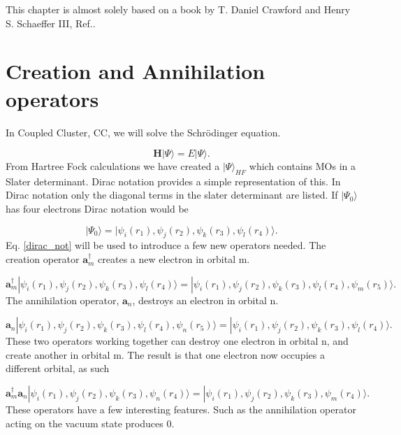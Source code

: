 \documentclass[a4paper,norsk,11pt,twoside]{report}
\begin{document}
This chapter is almost solely based on a book by T. Daniel Crawford and Henry S. Schaeffer III, Ref.\cite{ccsdbook11}. 

\section{Creation and Annihilation operators}
In Coupled Cluster, CC, we will solve the Schr\"{o}dinger equation.

\begin{equation}
\textbf{H} | \Psi \rangle = E | \Psi \rangle \label{SE} .
\end{equation}
From Hartree Fock calculations we have created a $|\Psi\rangle_{HF}$ which contains MOs in a Slater determinant. Dirac notation provides a simple representation of this. In Dirac notation only the diagonal terms in the slater determinant are listed. If $|\Psi_0 \rangle$ has four electrons Dirac notation would be

\begin{equation}
|\Psi_0 \rangle =  |\psi_i(r_1), \psi_j(r_2), \psi_k(r_3), \psi_l(r_4) \rangle . \label{dirac_not} 
\end{equation}
Eq. \eqref{dirac_not} will be used to introduce a few new operators needed. The creation operator $\textbf{a}^{\dag}_m$ creates a new electron in orbital m.

\begin{equation}
\textbf{a}^{\dag}_m |\psi_i(r_1), \psi_j(r_2), \psi_k(r_3), \psi_l(r_4) \rangle = |\psi_i(r_1), \psi_j(r_2), \psi_k(r_3), \psi_l(r_4), \psi_m(r_5) \rangle .
\end{equation}
The annihilation operator, $\textbf{a}_n$, destroys an electron in orbital n.

\begin{equation}
\textbf{a}_n |\psi_i(r_1), \psi_j(r_2), \psi_k(r_3), \psi_l(r_4), \psi_n(r_5) \rangle = |\psi_i(r_1), \psi_j(r_2), \psi_k(r_3), \psi_l(r_4) \rangle  .
\end{equation}
These two operators working together can destroy one electron in orbital n, and create another in orbital m. The result is that one electron now occupies a different orbital, as such

\begin{equation}
\textbf{a}^{\dag}_m \textbf{a}_n |\psi_i(r_1), \psi_j(r_2), \psi_k(r_3), \psi_n(r_4) \rangle = |\psi_i(r_1), \psi_j(r_2), \psi_k(r_3), \psi_m(r_4) \rangle .
\end{equation}
These operators have a few interesting features. Such as the annihilation operator acting on the vacuum state produces 0.
\end{document}
